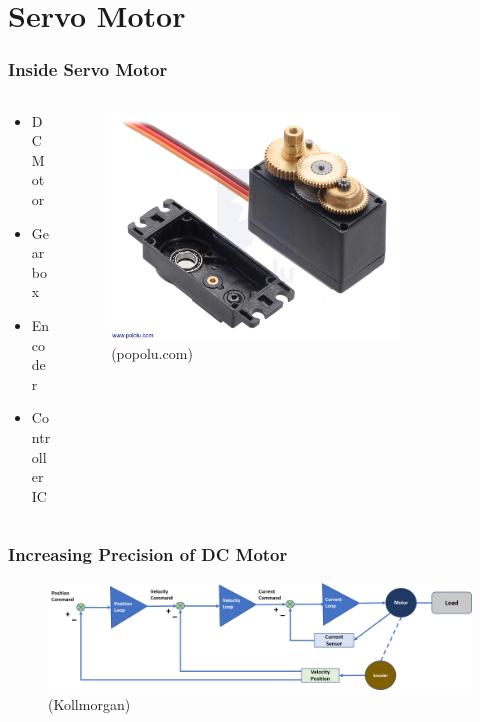 \documentclass[compress, aspectratio=32]{beamer}
\begin{document}
\section{Servo Motor}
\begin{frame}
    \frametitle{Inside Servo Motor}
    \begin{columns}
        \begin{column}[]{0.5\textwidth}
           \begin{itemize}
        \item DC Motor
        \item Gearbox
        \item Encoder
        \item Controller IC
    \end{itemize} 
        \end{column}
        \begin{column}[]{0.5\textwidth}
            \begin{figure}
                \centering
                \includegraphics[width=0.8\textwidth]{servo fs5115m.jpeg}
                \caption*{(popolu.com)}
            \end{figure}
        \end{column}
    \end{columns}
    
\end{frame}
\begin{frame}
    \frametitle{Increasing Precision of DC Motor}
    \begin{figure}
        \centering
        \includegraphics[width=\textwidth]{servo-motor-diagram-embedded-loops.jpg}
        \caption*{(Kollmorgan)}
    \end{figure}
\end{frame}
\end{document}
